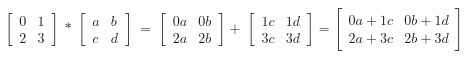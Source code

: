 \documentclass[12 pt]{slides}
\begin{document}
\begingroup
\[\begin{bmatrix}0 & 1\\2 & 3\end{bmatrix}\ *\ \begin{bmatrix}a & b\\c & d\end{bmatrix}\ =
\ \begin{bmatrix}0a & 0b\\2a & 2b\end{bmatrix} +\ \begin{bmatrix}1c & 1d\\3c & 3d\end{bmatrix}
= \begin{bmatrix}0a + 1c & 0b + 1d\\2a + 3c & 2b + 3d\end{bmatrix}\]
\endgroup
\end{document}
